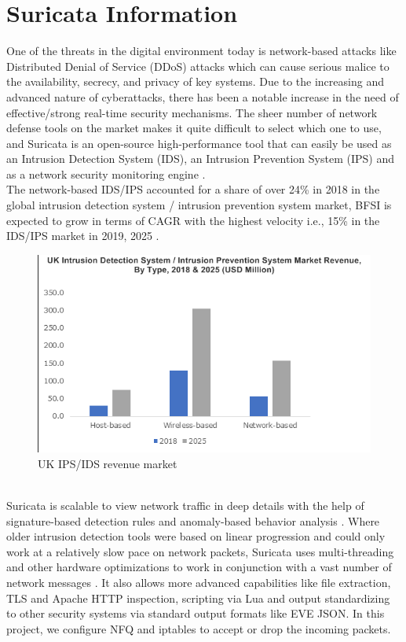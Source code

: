 \section{Suricata Information}
One of the threats in the digital environment today is network-based attacks like Distributed Denial of Service (DDoS) attacks which can cause serious malice to the availability, secrecy, and privacy of key systems. Due to the increasing and advanced nature of cyberattacks, there has been a notable increase in the need of effective/strong real-time security mechanisms. The sheer number of network defense tools on the market makes it quite difficult to select which one to use, and Suricata is an open-source high-performance tool that can easily be used as an Intrusion Detection System (IDS), an Intrusion Prevention System (IPS) and as a network security monitoring engine \cite{veerasingam2023intrusion}.
\\
The network-based IDS/IPS accounted for a share of over 24\% in 2018 in the global intrusion detection system / intrusion prevention system market, BFSI is expected to grow in terms of CAGR with the highest velocity i.e., 15\% in the IDS/IPS market in 2019, 2025 \cite{gminsights}. 
\pagebreak
\begin{figure}[!htb]
    \centering
    \includegraphics[width=0.8\linewidth]{thesis/ipsStats.png}
    \caption{UK IPS/IDS revenue market}
    \label{fig:enter-label}
\end{figure}
\\
Suricata is scalable to view network traffic in deep details with the help of signature-based detection rules and anomaly-based behavior analysis \cite{inbook}. Where older intrusion detection tools were based on linear progression and could only work at a relatively slow pace on network packets, Suricata uses multi-threading and other hardware optimizations to work in conjunction with a vast number of network messages \cite{article1}. It also allows more advanced capabilities like file extraction, TLS and Apache HTTP inspection, scripting via Lua and output standardizing to other security systems via standard output formats like EVE JSON. In this project, we configure NFQ and iptables to accept or drop the incoming packets.
